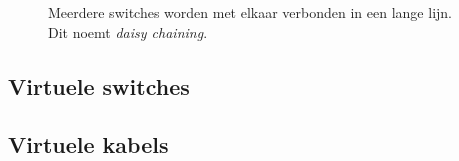 \begin{figure}
    \centering
    
    \caption{Meerdere switches worden met elkaar verbonden in een lange lijn. Dit noemt \emph{daisy chaining}.}
    \label{fig:daisy-chain}
\end{figure}


\subsection{Virtuele switches}


\subsection{Virtuele kabels}

